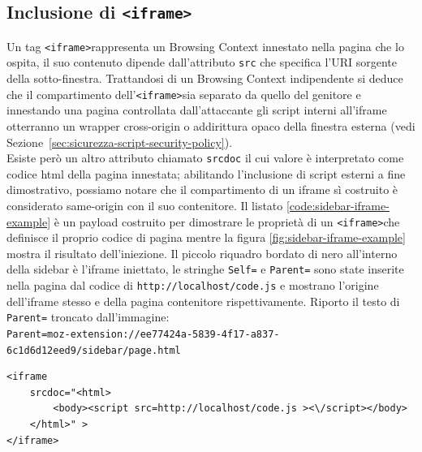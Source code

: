 \documentclass{sapthesis}
\newcommand{\code}[1]{\texttt{#1}}
\newcommand{\file}[1]{\code{#1}}
\newcommand{\refSection}[1]{Sezione~\ref{#1}}
\newcommand{\tagHTML}[1]{\code{<#1>}}
\newcommand{\iframe}{\tagHTML{iframe}}
\begin{document}
        \subsection{Inclusione di \iframe}
        \label{sec:attaccando-vuln-bypass-iframe}
            Un tag \iframe rappresenta un Browsing Context
            innestato nella pagina che lo ospita, il suo contenuto dipende dall'attributo \code{src} che specifica
            l'URI sorgente della sotto-finestra. Trattandosi di un Browsing Context indipendente si deduce che
            il compartimento dell'\iframe sia separato da quello del genitore e innestando una pagina controllata
            dall'attaccante gli script interni all'iframe otterranno un wrapper cross-origin o addirittura opaco
            della finestra esterna (vedi \refSection{sec:sicurezza-script-security-policy}).\\
            Esiste però un altro attributo chiamato \code{srcdoc} il cui valore è interpretato come codice html della
            pagina innestata; abilitando l'inclusione di script esterni a fine dimostrativo, possiamo notare che
            il compartimento di un iframe sì costruito è considerato same-origin con il suo contenitore.
            Il listato \ref{code:sidebar-iframe-example} è un payload costruito per dimostrare le proprietà di un
            \iframe che definisce il proprio codice di pagina mentre la figura \ref{fig:sidebar-iframe-example}
            mostra il risultato dell'iniezione. Il piccolo riquadro bordato di nero all'interno della sidebar è
            l'iframe iniettato, le stringhe \code{Self=} e \code{Parent=} sono state inserite nella pagina dal
            codice di \file{http://localhost/code.js} e mostrano l'origine dell'iframe stesso e della pagina
            contenitore rispettivamente. Riporto il testo di \code{Parent=} troncato dall'immagine:\\
            \code{Parent=moz-extension://ee77424a-5839-4f17-a837-6c1d6d12eed9/sidebar/page.html}\\

            \begin{lstlisting}[caption={iframe costruito con srcdoc},label={code:sidebar-iframe-example}]
<iframe 
    srcdoc="<html>
        <body><script src=http://localhost/code.js ><\/script></body>
    </html>" >
</iframe>
\end{lstlisting}
\end{document}
